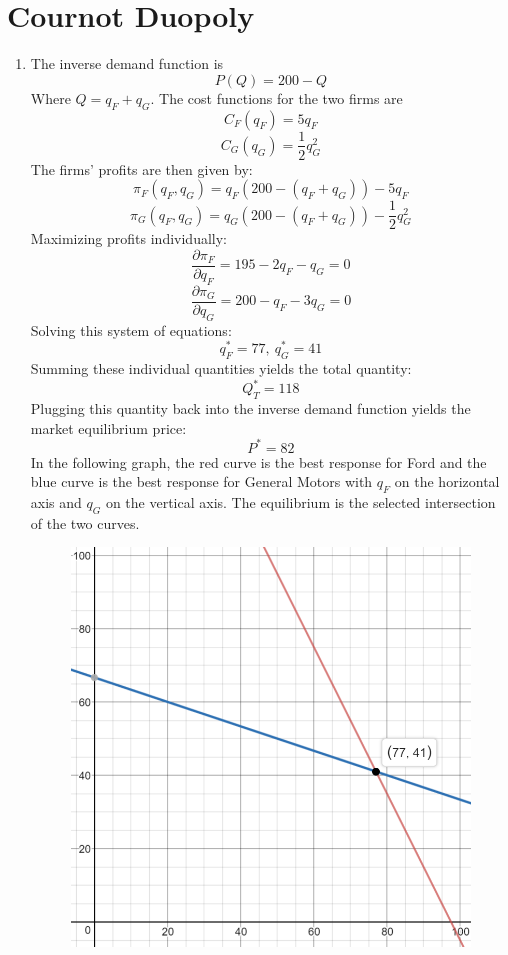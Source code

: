 \documentclass{article}
\begin{document}
\section{Cournot Duopoly}

\begin{enumerate}
    \item The inverse demand function is
        $$P(Q) = 200 - Q$$
        Where $Q = q_F + q_G$. The cost functions for the two firms are
        $$C_F(q_F) = 5 q_F$$
        $$C_G(q_G) = \frac{1}{2} q_G^2$$
        The firms' profits are then given by:
        $$\pi_F(q_F, q_G) = q_F (200 - (q_F + q_G)) - 5 q_F$$
        $$\pi_G(q_F, q_G) = q_G (200 - (q_F + q_G)) - \frac{1}{2} q_G^2$$
        Maximizing profits individually:
        $$\frac{\partial \pi_F}{\partial q_F} = 195 - 2 q_F - q_G = 0$$
        $$\frac{\partial \pi_G}{\partial q_G} = 200 - q_F - 3 q_G = 0$$
        Solving this system of equations: 
        $$q_F^* =  77,\ q_G^* = 41$$
        Summing these individual quantities yields the total quantity:
        $$Q_T^* = 118$$
        Plugging this quantity back into the inverse demand function yields the
        market equilibrium price:
        $$P^* = 82$$
        In the following graph, the red curve is the best response for Ford
        and the blue curve is the best response for General Motors with $q_F$ on
        the horizontal axis and $q_G$ on the vertical axis. The equilibrium is
        the selected intersection of the two curves.
        \begin{figure}[H]
            \centering
            \includegraphics[scale=0.8]{"Figure 1"}

\end{figure}
\end{enumerate}
\end{document}
